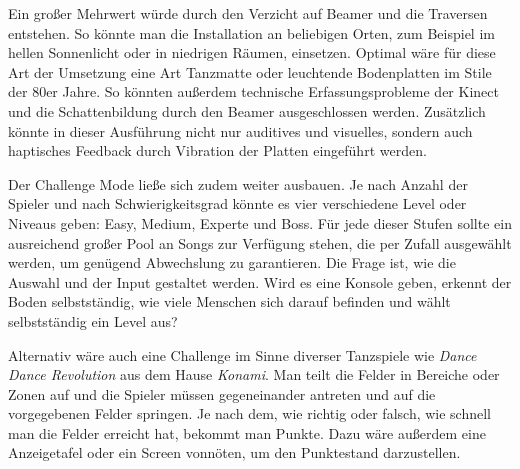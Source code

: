 
Ein großer Mehrwert würde durch den Verzicht auf Beamer und die Traversen entstehen. So könnte man die Installation an beliebigen Orten, zum Beispiel im hellen Sonnenlicht oder in niedrigen Räumen, einsetzen. Optimal wäre für diese Art der Umsetzung eine Art Tanzmatte oder leuchtende Bodenplatten im Stile der 80er Jahre. So könnten außerdem technische Erfassungsprobleme der Kinect und die Schattenbildung durch den Beamer ausgeschlossen werden. Zusätzlich könnte in dieser Ausführung nicht nur auditives und visuelles, sondern auch haptisches Feedback durch Vibration der Platten eingeführt werden.

Der Challenge Mode ließe sich zudem weiter ausbauen. Je nach Anzahl der Spieler und nach Schwierigkeitsgrad könnte es vier verschiedene Level oder Niveaus geben: Easy, Medium, Experte und Boss. Für jede dieser Stufen sollte ein ausreichend großer Pool an Songs zur Verfügung stehen, die per Zufall ausgewählt werden, um genügend Abwechslung zu garantieren. Die Frage ist, wie die Auswahl und der Input gestaltet werden. Wird es eine Konsole geben, erkennt der Boden selbstständig, wie viele Menschen sich darauf befinden und wählt selbstständig ein Level aus?

Alternativ wäre auch eine Challenge im Sinne diverser Tanzspiele wie \emph{Dance Dance Revolution} aus dem Hause \emph{Konami}. Man teilt die Felder in Bereiche oder Zonen auf und die Spieler müssen gegeneinander antreten und auf die vorgegebenen Felder springen. Je nach dem, wie richtig oder falsch, wie schnell man die Felder erreicht hat, bekommt man Punkte. Dazu wäre außerdem eine Anzeigetafel oder ein Screen vonnöten, um den Punktestand darzustellen.